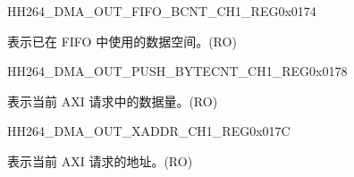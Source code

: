 \begin{register}{H}{H264\_DMA\_OUT\_FIFO\_BCNT\_CH1\_REG}{0x0174}\label{regdesc:H264DMAOUTFIFOBCNTCH1REG}
%
%
\regnewline%
\begin{regdesc}\begin{reglist}
\label{fielddesc:H264DMAOUTCMDFIFOOUTFIFOBCNTCH1}\item [H264\_DMA\_OUT\_CMDFIFO\_OUTFIFO\_BCNT\_CH1] 表示已在 FIFO 中使用的数据空间。(RO)
\end{reglist}\end{regdesc}
\end{register}


\begin{register}{H}{H264\_DMA\_OUT\_PUSH\_BYTECNT\_CH1\_REG}{0x0178}\label{regdesc:H264DMAOUTPUSHBYTECNTCH1REG}
%
%
\regnewline%
\begin{regdesc}\begin{reglist}
\label{fielddesc:H264DMAOUTCMDFIFOPUSHBYTECNTCH1}\item [H264\_DMA\_OUT\_CMDFIFO\_PUSH\_BYTECNT\_CH1] 表示当前 AXI 请求中的数据量。(RO)
\end{reglist}\end{regdesc}
\end{register}


\begin{register}{H}{H264\_DMA\_OUT\_XADDR\_CH1\_REG}{0x017C}\label{regdesc:H264DMAOUTXADDRCH1REG}
%
\regnewline%
\begin{regdesc}\begin{reglist}
\label{fielddesc:H264DMAOUTCMDFIFOXADDRCH1}\item [H264\_DMA\_OUT\_CMDFIFO\_XADDR\_CH1] 表示当前 AXI 请求的地址。(RO)
\end{reglist}\end{regdesc}
\end{register}


